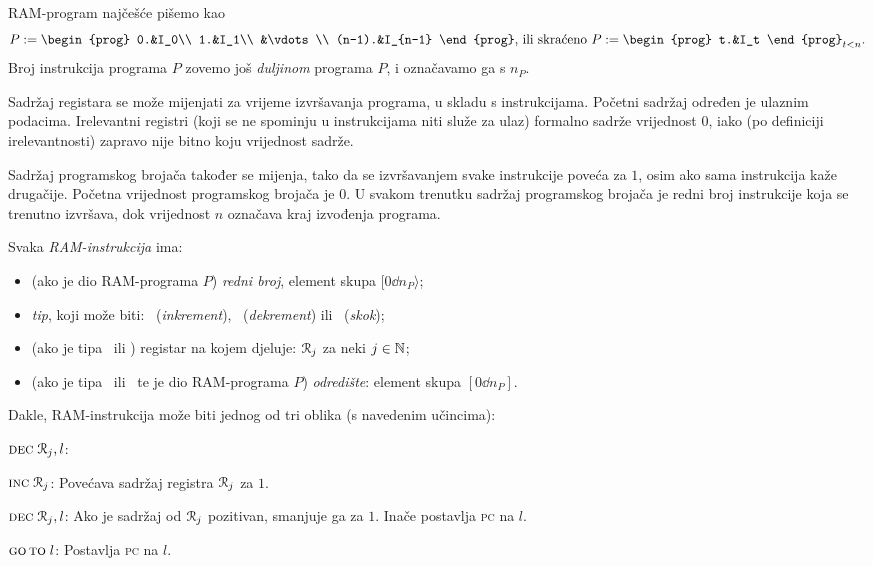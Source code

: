 RAM-program najčešće pišemo kao \begin{equation}
P:=\begin{prog}
    0.&I_0\\
    1.&I_1\\
    &\vdots\\
    (n-1).&I_{n-1}
    \end{prog}\text{, ili skraćeno } P:=\begin{prog}
    t.&I_t
    \end{prog}_{t<n}\text.
\end{equation}
Broj instrukcija programa $P$ zovemo još \emph{duljinom} programa $P$, i označavamo ga s $n_P$.

Sadržaj registara se može mijenjati za vrijeme izvršavanja programa, u skladu s instrukcijama. Početni sadržaj određen je ulaznim podacima. Irelevantni registri (koji se ne spominju u instrukcijama niti služe za ulaz) formalno sadrže vrijednost $0$, iako (po definiciji irelevantnosti) zapravo nije bitno koju vrijednost sadrže.

Sadržaj programskog brojača također se mijenja, tako da se iz\-vr\-ša\-va\-njem svake instrukcije poveća za $1$, osim ako sama instrukcija kaže drugačije. Početna vrijednost programskog brojača je $0$. U svakom trenutku sadržaj programskog brojača je redni broj instrukcije koja se trenutno izvršava, dok vrijednost $n$ označava kraj izvođenja programa.

\begin{definicija}[{name=[RAM-instrukcija]}]\label{def:ins}
Svaka \emph{RAM-instrukcija} ima:
\begin{itemize}
    \item (ako je dio RAM-programa $P$) \emph{redni broj}, element skupa $[0\dd n_P\rangle$;
    \item \emph{tip}, koji može biti: \inc\ (\hspace{-1pt}\emph{inkrement}\/), \dec\ (\hspace{-1pt}\emph{dekrement}\/) ili \goto\ (\hspace{-1pt}\emph{skok}\/);
    \item (ako je tipa \inc\ ili \dec) registar na kojem djeluje: $\mathcal R_{j}$ za neki $j\in{\mathbb N}$;
    \item (ako je tipa \dec\ ili \goto\ te je dio RAM-programa $P$) \emph{odredište}: element skupa $[0\dd n_P]$.
    \qedhere
\end{itemize}
\end{definicija}

Dakle, RAM-instrukcija može biti jednog od tri oblika (s navedenim učincima):
\begin{labeling}{$\textsc{dec}\;\mathcal R_{j},l$:}
    \item[$\textsc{inc}\;\mathcal R_{j}$:] Povećava sadržaj registra $\mathcal R_{j}$ za $1$.
    \item[$\textsc{dec}\;\mathcal R_{j},l$:] Ako je sadržaj od $\mathcal R_{j}$ pozitivan, smanjuje ga za $1$. Inače postavlja \textsc{pc} na $l$.
    \item[$\textsc{go\,to}\;l$:] Postavlja \textsc{pc} na $l$.
\end{labeling}

